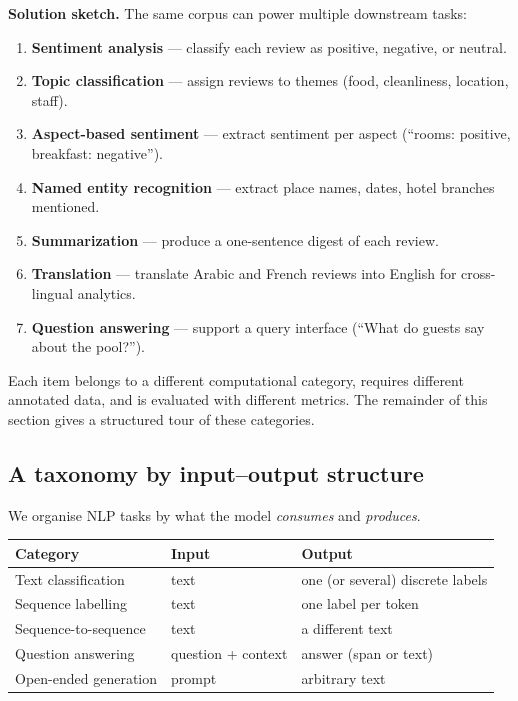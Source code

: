 \textbf{Solution sketch.} The same corpus can power multiple downstream tasks:
\begin{enumerate}
    \item \textbf{Sentiment analysis} --- classify each review as positive, negative, or neutral.
    \item \textbf{Topic classification} --- assign reviews to themes (food, cleanliness, location, staff).
    \item \textbf{Aspect-based sentiment} --- extract sentiment per aspect (``rooms: positive, breakfast: negative'').
    \item \textbf{Named entity recognition} --- extract place names, dates, hotel branches mentioned.
    \item \textbf{Summarization} --- produce a one-sentence digest of each review.
    \item \textbf{Translation} --- translate Arabic and French reviews into English for cross-lingual analytics.
    \item \textbf{Question answering} --- support a query interface (``What do guests say about the pool?'').
\end{enumerate}
Each item belongs to a different computational category, requires different annotated data, and is evaluated with different metrics. The remainder of this section gives a structured tour of these categories.

\subsection{A taxonomy by input--output structure}

We organise NLP tasks by what the model \emph{consumes} and \emph{produces}.

\begin{center}
\begin{tabular}{|l|l|l|}
\hline
\textbf{Category} & \textbf{Input} & \textbf{Output} \\
\hline
Text classification & text & one (or several) discrete labels \\
Sequence labelling & text & one label per token \\
Sequence-to-sequence & text & a different text \\
Question answering & question + context & answer (span or text) \\
Open-ended generation & prompt & arbitrary text \\
\hline
\end{tabular}
\end{center}

